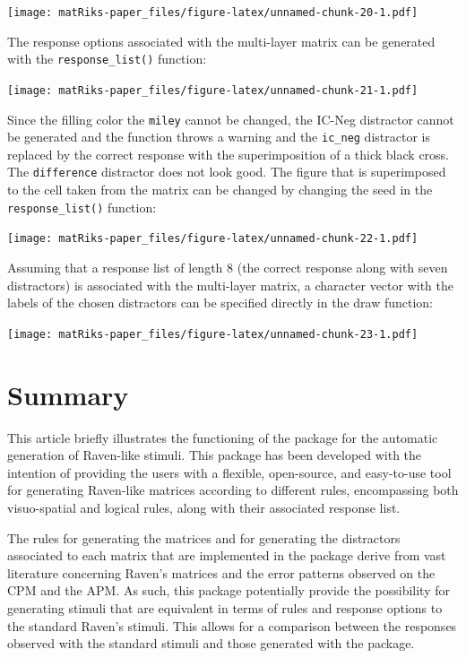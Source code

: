 \texttt{[image: matRiks-paper\_files/figure-latex/unnamed-chunk-20-1.pdf]}

The response options associated with the multi-layer matrix can be generated with the \texttt{response\_list()} function:

\texttt{[image: matRiks-paper\_files/figure-latex/unnamed-chunk-21-1.pdf]}

Since the filling color the \texttt{miley} cannot be changed, the IC-Neg distractor cannot be generated and the function throws a warning and the \texttt{ic\_neg} distractor is replaced by the correct response with the superimposition of a thick black cross.
The \texttt{difference} distractor does not look good. The figure that is superimposed to the cell taken from the matrix can be changed by changing the seed in the \texttt{response\_list()} function:

\texttt{[image: matRiks-paper\_files/figure-latex/unnamed-chunk-22-1.pdf]}

Assuming that a response list of length 8 (the correct response along with seven distractors) is associated with the multi-layer matrix, a character vector with the labels of the chosen distractors can be specified directly in the draw function:

\texttt{[image: matRiks-paper\_files/figure-latex/unnamed-chunk-23-1.pdf]}

\section{Summary}\label{summary}

This article briefly illustrates the functioning of the  package for the automatic generation of Raven-like stimuli.
This package has been developed with the intention of providing the users with a flexible, open-source, and easy-to-use tool for generating Raven-like matrices according to different rules, encompassing both visuo-spatial and logical rules, along with their associated response list.

The rules for generating the matrices and for generating the distractors associated to each matrix that are implemented in the  package derive from vast literature concerning Raven's matrices and the error patterns observed on the CPM and the APM.
As such, this package potentially provide the possibility for generating stimuli that are equivalent in terms of rules and response options to the standard Raven's stimuli. This allows for a comparison between the responses observed with the standard stimuli and those generated with the package.


